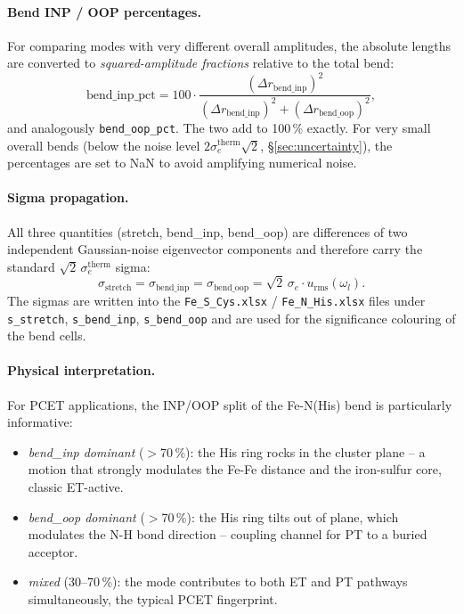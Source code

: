\documentclass[11pt,a4paper,twoside]{article}
\newcommand{\urms}{u_{\mathrm{rms}}}
\theoremstyle{remark}
\begin{document}
\paragraph{Bend INP / OOP percentages.}
For comparing modes with very different overall amplitudes, the
absolute lengths are converted to \emph{squared-amplitude
fractions} relative to the total bend:
\begin{equation}
  \text{bend\_inp\_pct} = 100 \cdot
     \frac{(\Delta r_\text{bend\_inp})^2}
          {(\Delta r_\text{bend\_inp})^2 + (\Delta r_\text{bend\_oop})^2},
\end{equation}
and analogously \texttt{bend\_oop\_pct}. The two add to 100\,\%
exactly. For very small overall bends (below the noise level
$2\sigma_e^\text{therm}\sqrt{2}$, \S\ref{sec:uncertainty}), the
percentages are set to NaN to avoid amplifying numerical noise.

\paragraph{Sigma propagation.}
All three quantities (stretch, bend\_inp, bend\_oop) are differences
of two independent Gaussian-noise eigenvector components and
therefore carry the standard $\sqrt{2}\,\sigma_e^\text{therm}$ sigma:
\begin{equation}
  \sigma_\text{stretch} = \sigma_\text{bend\_inp}
  = \sigma_\text{bend\_oop}
  = \sqrt{2}\,\sigma_e \cdot \urms(\omega_l).
\end{equation}
The sigmas are written into the
\texttt{Fe\_S\_Cys.xlsx} / \texttt{Fe\_N\_His.xlsx} files under
\texttt{s\_stretch}, \texttt{s\_bend\_inp}, \texttt{s\_bend\_oop}
and are used for the significance colouring of the bend cells.

\paragraph{Physical interpretation.}
For PCET applications, the INP/OOP split of the Fe-N(His) bend is
particularly informative:
\begin{itemize}\setlength{\itemsep}{0pt}
  \item \emph{bend\_inp dominant} ($>$70\,\%): the His ring rocks
        in the cluster plane -- a motion that strongly modulates
        the Fe-Fe distance and the iron-sulfur core, classic
        ET-active.
  \item \emph{bend\_oop dominant} ($>$70\,\%): the His ring tilts
        out of plane, which modulates the N-H bond direction --
        coupling channel for PT to a buried acceptor.
  \item \emph{mixed} (30--70\,\%): the mode contributes to both
        ET and PT pathways simultaneously, the typical PCET
        fingerprint.
\end{itemize}
\end{document}
